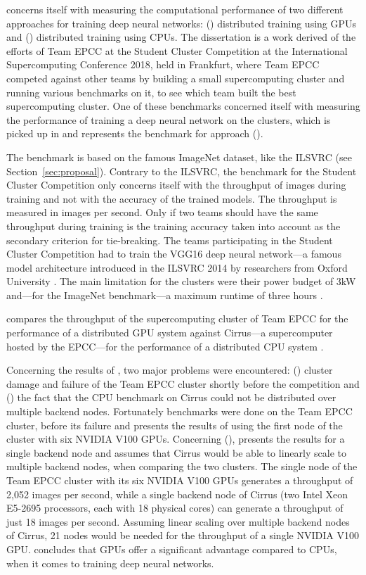 \documentclass{article}
\begin{document}
\citet{nita_2018} concerns itself with measuring the
computational performance of two different approaches for
training deep neural networks: ()
distributed training using GPUs and ()
distributed training using CPUs.
The dissertation is a work derived of the efforts of
Team EPCC at the Student Cluster Competition at the
International Supercomputing Conference 2018, held in
Frankfurt, where Team EPCC competed against other teams by
building a small supercomputing cluster and running various
benchmarks on it, to see which team built the best
supercomputing cluster.
One of these benchmarks concerned itself with measuring the
performance of training a deep neural network on the
clusters, which is picked up in \citet{nita_2018} and
represents the benchmark for approach ().


The benchmark is based on the famous ImageNet dataset, like
the ILSVRC (see Section~\ref{sec:proposal}).
Contrary to the ILSVRC, the benchmark for the Student
Cluster Competition only concerns itself with the
throughput of images during training and not with the
accuracy of the trained models.
The throughput is measured in images per second.
Only if two teams should have the same throughput during
training is the training accuracy taken into account as
the secondary criterion for tie-breaking.
The teams participating in the Student Cluster Competition
had to train the VGG16 deep neural network---a famous
model architecture introduced in the ILSVRC 2014 by
researchers from Oxford University
\citep{simonyan_et_al_2014}.
The main limitation for the clusters were their power
budget of 3kW and---for the ImageNet benchmark---a maximum
runtime of three hours \citep{nita_2018}.

\citet{nita_2018} compares the throughput of the
supercomputing cluster of Team EPCC for the performance of
a distributed GPU system against Cirrus---a supercomputer
hosted by the EPCC---for the performance of a distributed
CPU system \citep{cirrus}.

Concerning the results of \citet{nita_2018}, two major
problems were encountered: () cluster
damage and failure of the Team EPCC cluster shortly before
the competition and () the fact that the CPU
benchmark on Cirrus could not be distributed over multiple
backend nodes.
Fortunately benchmarks were done on the Team EPCC cluster,
before its failure and \citet{nita_2018} presents the
results of using the first node of the cluster with six
NVIDIA V100 GPUs.
Concerning (), \citet{nita_2018} presents
the results for a single backend node and assumes that
Cirrus would be able to linearly scale to multiple backend
nodes, when comparing the two clusters.
The single node of the Team EPCC cluster with its six
NVIDIA V100 GPUs generates a throughput of 2,052 images per
second, while a single backend node of Cirrus (two Intel
Xeon E5-2695 processors, each with 18 physical cores) can
generate a throughput of just 18 images per second.
Assuming linear scaling over multiple backend nodes of
Cirrus, 21 nodes would be needed for the throughput of a
single NVIDIA V100 GPU.
\citet{nita_2018} concludes that GPUs offer a significant
advantage compared to CPUs, when it comes to training
deep neural networks.
\end{document}
